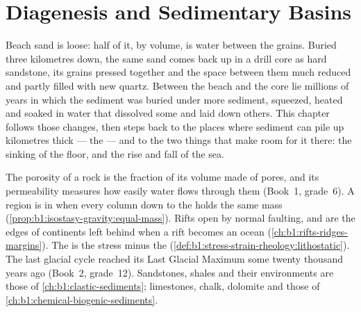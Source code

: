 \chapter{Diagenesis and Sedimentary Basins}\label{ch:b1:diagenesis-basins}

Beach sand is loose: half of it, by volume, is water between the grains. Buried
three kilometres down, the same sand comes back up in a drill core as hard
sandstone, its grains pressed together and the space between them much reduced
and partly filled with new quartz. Between the beach and the core lie millions of years in which
the sediment was buried under more sediment, squeezed, heated and soaked in
water that dissolved some  and laid down others. This chapter follows
those changes, then steps back to the places where sediment can pile up
kilometres thick --- the  --- and to the two things that make
room for it there: the sinking of the floor, and the rise and fall of the sea.

\begin{recall}
The porosity of a rock is the fraction of its volume made of pores, and its
permeability measures how easily water flows through them (Book~1, grade~6).
A region is in  when every column down to the  holds
the same mass (\cref{prop:b1:isostasy-gravity:equal-mass}). Rifts open by normal
faulting, and  are the edges of continents left behind when a
rift becomes an ocean (\cref{ch:b1:rifts-ridges-margins}). The 
is the stress minus the 
(\cref{def:b1:stress-strain-rheology:lithostatic}). The last glacial cycle
reached its Last Glacial Maximum some twenty thousand years ago (Book~2,
grade~12). Sandstones, shales and their environments are those of
\cref{ch:b1:clastic-sediments}; limestones, chalk, dolomite and  those
of \cref{ch:b1:chemical-biogenic-sediments}.
\end{recall}

